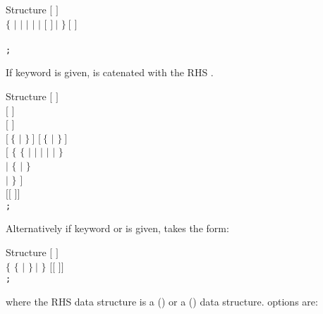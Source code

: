 \begin{DataStructure}{Structure }
$[$   $]$ \\
$\{$  $|$  $|$  $|$  $|$  $|$  $[$  $]~|$  $\}~[$  $]$ \\ 
 \\
{\tt ;}
\end{DataStructure}

\noindent
If keyword  is given,  is catenated with the RHS   .

\begin{DataStructure}{Structure }
$[$   $]$ \\
$[$   $]$ \\
$[$   $]$ \\
$[~\{$  $|$  $\}~]$
$[~\{$  $|$  $\}~]$ \\
$[$  $\{$  $\{$  $|$  $|$  $|$  $|$  $|$  $\}$   \\
\hskip 0.6cm $|$  $\{$  $|$  $\}$    \\
\hskip 0.6cm $|$   $\}$ $]$ \\
 $[[$  $]]$ \\
{\tt ;}
\end{DataStructure}

\noindent
Alternatively if keyword  or  is given,  takes the form:

\begin{DataStructure}{Structure }
$[$   $]$ \\
$\{$  $\{$  $|$  $\}~|$  $\}$
$[[$  $]]$ \\
{\tt ;}
\end{DataStructure}
\noindent where the RHS data structure is a  () or a  () data structure.  options are:


